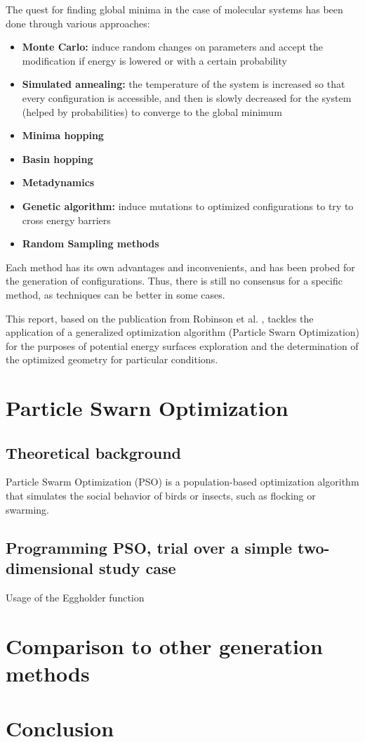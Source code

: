 \documentclass[11pt]{article}
\begin{document}
\begin{multicols}{2}
\noindent The quest for finding global minima in the case of molecular systems has been done through various approaches:
\begin{itemize}
    \itemsep0em
    \item \textbf{Monte Carlo:} induce random changes on parameters and accept the modification if energy is lowered or with a certain probability \cite{PhysRevB.95.144104}
    \item \textbf{Simulated annealing:} the temperature of the system is increased so that every configuration is accessible, and then is slowly decreased for the system (helped by probabilities) to converge to the global minimum
    \item \textbf{Minima hopping}
    \item \textbf{Basin hopping}
    \item \textbf{Metadynamics}
    \item \textbf{Genetic algorithm:} induce mutations to optimized configurations to try to cross energy barriers
    \item \textbf{Random Sampling methods}
\end{itemize}
Each method has its own advantages and inconvenients, and has been probed for the generation of configurations. Thus, there is still no consensus for a specific method, as techniques can be better in some cases. \vspace{1em}

This report, based on the publication from Robinson et al. \cite{original}, tackles the application of a generalized optimization algorithm (Particle Swarn Optimization) for the purposes of potential energy surfaces exploration and the determination of the optimized geometry for particular conditions.

\section{Particle Swarn Optimization}
\subsection{Theoretical background}
Particle Swarm Optimization (PSO) is a population-based optimization algorithm that simulates the social behavior of birds or insects, such as flocking or swarming.
\subsection{Programming PSO, trial over a simple two-dimensional study case}
Usage of the Eggholder function
\section{Comparison to other generation methods}

\section{Conclusion}
\end{multicols}


\end{document}
